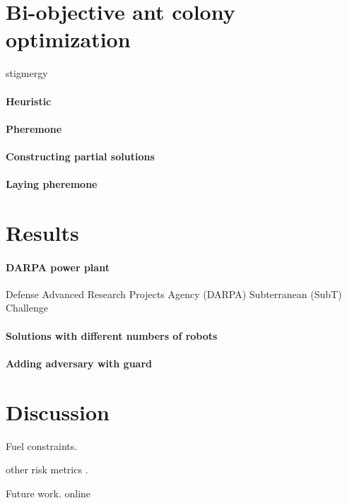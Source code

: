 \documentclass[11pt, oneside]{article}
\begin{document}
\section{Bi-objective ant colony optimization}
stigmergy

\paragraph{Heuristic}

\paragraph{Pheremone}

\paragraph{Constructing partial solutions}

\paragraph{Laying pheremone}

\section{Results}

\paragraph{DARPA power plant}

Defense Advanced Research Projects Agency (DARPA) Subterranean (SubT) Challenge \cite{chung2023into}

\paragraph{Solutions with different numbers of robots}

\paragraph{Adding adversary with guard}

\section{Discussion}

Fuel constraints.

other risk metrics \cite{majumdar2020should}.

Future work. online




\end{document}
